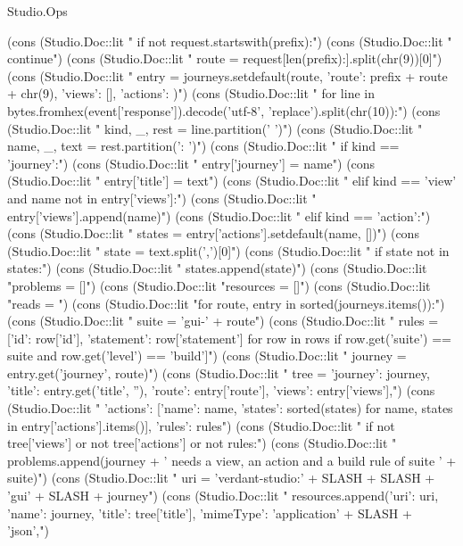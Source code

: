 \begin{lexlean}{Studio.Ops}
\begin{semanticmodule}
{{    (cons (Studio.Doc::lit "    if not request.startswith(prefix):\n")
    (cons (Studio.Doc::lit "        continue\n")
    (cons (Studio.Doc::lit "    route = request[len(prefix):].split(chr(9))[0]\n")
    (cons (Studio.Doc::lit "    entry = journeys.setdefault(route, {'route': prefix + route + chr(9), 'views': [], 'actions': {}})\n")
    (cons (Studio.Doc::lit "    for line in bytes.fromhex(event['response']).decode('utf-8', 'replace').split(chr(10)):\n")
    (cons (Studio.Doc::lit "        kind, _, rest = line.partition(' ')\n")
    (cons (Studio.Doc::lit "        name, _, text = rest.partition(': ')\n")
    (cons (Studio.Doc::lit "        if kind == 'journey':\n")
    (cons (Studio.Doc::lit "            entry['journey'] = name\n")
    (cons (Studio.Doc::lit "            entry['title'] = text\n")
    (cons (Studio.Doc::lit "        elif kind == 'view' and name not in entry['views']:\n")
    (cons (Studio.Doc::lit "            entry['views'].append(name)\n")
    (cons (Studio.Doc::lit "        elif kind == 'action':\n")
    (cons (Studio.Doc::lit "            states = entry['actions'].setdefault(name, [])\n")
    (cons (Studio.Doc::lit "            state = text.split(',')[0]\n")
    (cons (Studio.Doc::lit "            if state not in states:\n")
    (cons (Studio.Doc::lit "                states.append(state)\n")
    (cons (Studio.Doc::lit "problems = []\n")
    (cons (Studio.Doc::lit "resources = []\n")
    (cons (Studio.Doc::lit "reads = {}\n")
    (cons (Studio.Doc::lit "for route, entry in sorted(journeys.items()):\n")
    (cons (Studio.Doc::lit "    suite = 'gui-' + route\n")
    (cons (Studio.Doc::lit "    rules = [{'id': row['id'], 'statement': row['statement']} for row in rows if row.get('suite') == suite and row.get('level') == 'build']\n")
    (cons (Studio.Doc::lit "    journey = entry.get('journey', route)\n")
    (cons (Studio.Doc::lit "    tree = {'journey': journey, 'title': entry.get('title', ''), 'route': entry['route'], 'views': entry['views'],\n")
    (cons (Studio.Doc::lit "            'actions': [{'name': name, 'states': sorted(states)} for name, states in entry['actions'].items()], 'rules': rules}\n")
    (cons (Studio.Doc::lit "    if not tree['views'] or not tree['actions'] or not rules:\n")
    (cons (Studio.Doc::lit "        problems.append(journey + ' needs a view, an action and a build rule of suite ' + suite)\n")
    (cons (Studio.Doc::lit "    uri = 'verdant-studio:' + SLASH + SLASH + 'gui' + SLASH + journey\n")
    (cons (Studio.Doc::lit "    resources.append({'uri': uri, 'name': journey, 'title': tree['title'], 'mimeType': 'application' + SLASH + 'json',\n")
}}}
\end{semanticmodule}
\end{lexlean}
